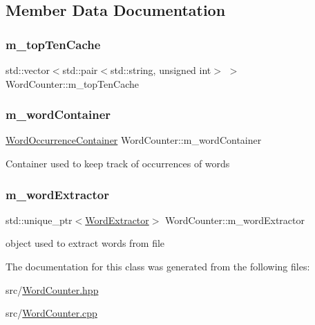 \subsection{Member Data Documentation}
\mbox{\label{class_word_counter_ab38650b6b6b1e07168682573f7923d24}} 
\subsubsection{\texorpdfstring{m\+\_\+top\+Ten\+Cache}{m\_topTenCache}}
{\footnotesize\ttfamily std\+::vector$<$std\+::pair$<$std\+::string, unsigned int$>$ $>$ Word\+Counter\+::m\+\_\+top\+Ten\+Cache\hspace{0.3cm}{\ttfamily [private]}}

\mbox{\label{class_word_counter_a7f867e08264a28ccfc65972bc42e409b}} 
\subsubsection{\texorpdfstring{m\+\_\+word\+Container}{m\_wordContainer}}
{\footnotesize\ttfamily \mbox{\hyperlink{class_word_occurrence_container}{Word\+Occurrence\+Container}} Word\+Counter\+::m\+\_\+word\+Container\hspace{0.3cm}{\ttfamily [private]}}

Container used to keep track of occurrences of words \mbox{\label{class_word_counter_aefb9611fa991d6e0e7dccd64403150cb}} 
\subsubsection{\texorpdfstring{m\+\_\+word\+Extractor}{m\_wordExtractor}}
{\footnotesize\ttfamily std\+::unique\+\_\+ptr$<$\mbox{\hyperlink{class_word_extractor}{Word\+Extractor}}$>$ Word\+Counter\+::m\+\_\+word\+Extractor\hspace{0.3cm}{\ttfamily [private]}}

object used to extract words from file 

The documentation for this class was generated from the following files\+:\begin{DoxyCompactItemize}
\item 
src/\mbox{\hyperlink{_word_counter_8hpp}{Word\+Counter.\+hpp}}\item 
src/\mbox{\hyperlink{_word_counter_8cpp}{Word\+Counter.\+cpp}}\end{DoxyCompactItemize}
